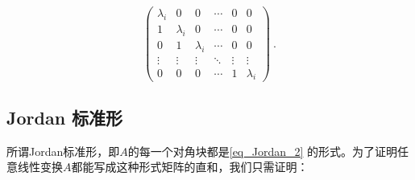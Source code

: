 \begin{equation}\label{eq_Jordan_2}
\left(\begin{array}{cccccc}
\lambda_i & 0 & 0 & \cdots & 0 & 0 \\
1 & \lambda_i & 0 & \cdots & 0 & 0 \\
0 & 1 & \lambda_i & \cdots & 0 & 0 \\
\vdots & \vdots & \vdots & \ddots & \vdots & \vdots \\
0 & 0 & 0 & \cdots & 1 & \lambda_i
\end{array}\right)~.
\end{equation}
\subsection{Jordan 标准形}
所谓Jordan标准形，即$A$的每一个对角块都是\autoref{eq_Jordan_2} 的形式。为了证明任意线性变换$A$都能写成这种形式矩阵的直和，我们只需证明：
